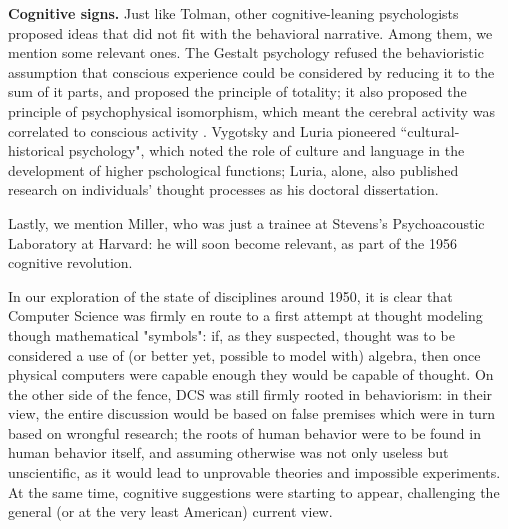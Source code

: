 \documentclass[../main.tex]{subfiles}
\begin{document}
\vspace{4pt}
\textbf{Cognitive signs.}
Just like Tolman, other cognitive-leaning psychologists proposed ideas that did not fit with the behavioral narrative. Among them, we mention some relevant ones. The Gestalt psychology refused the behavioristic assumption that conscious experience could be considered by reducing it to the sum of it parts, and proposed the principle of totality; it also proposed the principle of psychophysical isomorphism, which meant the cerebral activity was correlated to conscious activity \cite{wagemansCenturyGestaltPsychology2012}. Vygotsky and Luria pioneered ``cultural-historical psychology", which noted the role of culture and language in the development of higher pschological functions; Luria, alone, also published research on individuals' thought processes as his doctoral dissertation.

Lastly, we mention Miller, who was just a trainee at Stevens's Psychoacoustic Laboratory at Harvard: he will soon become relevant, as part of the 1956 cognitive revolution.

\vspace{4pt}
In our exploration of the state of disciplines around 1950, it is clear that Computer Science was firmly en route to a first attempt at thought modeling though mathematical "symbols": if, as they suspected, thought was to be considered a use of (or better yet, possible to model with) algebra, then once physical computers were capable enough they would be capable of thought. On the other side of the fence, DCS was still firmly rooted in behaviorism: in their view, the entire discussion would be based on false premises which were in turn based on wrongful research; the roots of human behavior were to be found in human behavior itself, and assuming otherwise was not only useless but unscientific, as it would lead to unprovable theories and impossible experiments. At the same time, cognitive suggestions were starting to appear, challenging the general (or at the very least American) current view.
\end{document}
